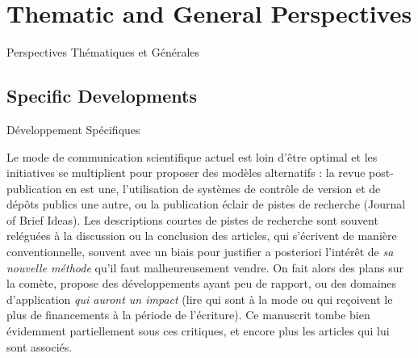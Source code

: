 



\chapter{Thematic and General Perspectives}{Perspectives Thématiques et Générales} %

\label{ch:opening} %




\headercit{}{}{}

\bigskip







\newpage


\section{Specific Developments}{Développement Spécifiques}



Le mode de communication scientifique actuel est loin d'être optimal %
et les initiatives se multiplient pour proposer des modèles alternatifs : la revue post-publication en est une, l'utilisation de systèmes de contrôle de version et de dépôts publics une autre, ou la publication éclair de pistes de recherche (Journal of Brief Ideas). %
Les descriptions courtes de pistes de recherche sont souvent reléguées à la discussion ou la conclusion des articles, qui s'écrivent de manière conventionnelle, souvent avec un biais pour justifier a posteriori l'intérêt de \emph{sa nouvelle méthode} qu'il faut malheureusement vendre. On fait alors des plans sur la comète, propose des développements ayant peu de rapport, ou des domaines d'application \emph{qui auront un impact} (lire qui sont à la mode ou qui reçoivent le plus de financements à la période de l'écriture). %
Ce manuscrit tombe bien évidemment partiellement sous ces critiques, et encore plus les articles qui lui sont associés.



